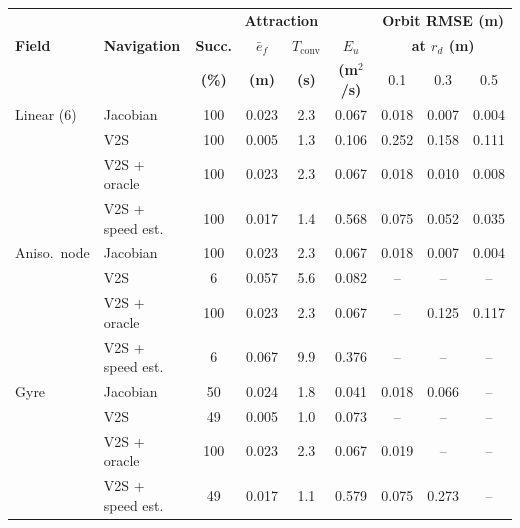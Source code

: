 \begin{tabular}{ll|cccc|ccc}
\hline
 & & \multicolumn{4}{c|}{\textbf{Attraction}} & \multicolumn{3}{c}{\textbf{Orbit RMSE (m)}} \\
\textbf{Field} & \textbf{Navigation} & \textbf{Succ.} & \textbf{$\bar{e}_f$} & \textbf{$T_{\mathrm{conv}}$} & \textbf{$E_u$} & \multicolumn{3}{c}{\textbf{at $r_d$ (m)}} \\
 & & \textbf{(\%)} & \textbf{(m)} & \textbf{(s)} & \textbf{(m$^2$/s)} & 0.1 & 0.3 & 0.5 \\
\hline
Linear (6) & Jacobian & 100 & 0.023 & 2.3 & 0.067 & 0.018 & 0.007 & 0.004 \\
 & V2S & 100 & 0.005 & 1.3 & 0.106 & 0.252 & 0.158 & 0.111 \\
 & V2S + oracle & 100 & 0.023 & 2.3 & 0.067 & 0.018 & 0.010 & 0.008 \\
 & V2S + speed est. & 100 & 0.017 & 1.4 & 0.568 & 0.075 & 0.052 & 0.035 \\
\hline
Aniso.\ node & Jacobian & 100 & 0.023 & 2.3 & 0.067 & 0.018 & 0.007 & 0.004 \\
 & V2S & 6 & 0.057 & 5.6 & 0.082 & -- & -- & -- \\
 & V2S + oracle & 100 & 0.023 & 2.3 & 0.067 & -- & 0.125 & 0.117 \\
 & V2S + speed est. & 6 & 0.067 & 9.9 & 0.376 & -- & -- & -- \\
\hline
Gyre & Jacobian & 50 & 0.024 & 1.8 & 0.041 & 0.018 & 0.066 & -- \\
 & V2S & 49 & 0.005 & 1.0 & 0.073 & -- & -- & -- \\
 & V2S + oracle & 100 & 0.023 & 2.3 & 0.067 & 0.019 & -- & -- \\
 & V2S + speed est. & 49 & 0.017 & 1.1 & 0.579 & 0.075 & 0.273 & -- \\
\hline
\end{tabular}
